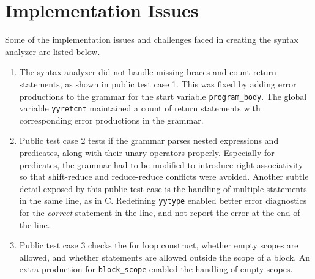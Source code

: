 \documentclass[journal,12pt,twocolumn]{IEEEtran}
\begin{document}
\section{Implementation Issues}
Some of the implementation issues and challenges faced in creating the syntax
analyzer are listed below.
\begin{enumerate}
    \item The syntax analyzer did not handle missing braces and count return
    statements, as shown in public test case 1. This was fixed by adding error
    productions to the grammar for the start variable \texttt{program\_body}.
    The global variable \texttt{yyretcnt} maintained a count of return
    statements with corresponding error productions in the grammar. 
    \item Public test case 2 tests if the grammar parses nested expressions and
    predicates, along with their unary operators properly. Especially for
    predicates, the grammar had to be modified to introduce right associativity
    so that shift-reduce and reduce-reduce conflicts were avoided. Another
    subtle detail exposed by this public test case is the handling of multiple
    statements in the same line, as in C. Redefining \texttt{yytype} enabled
    better error diagnostics for the \emph{correct} statement in the line, and
    not report the error at the end of the line.
    \item Public test case 3 checks the for loop construct, whether empty scopes
    are allowed, and whether statements are allowed outside the scope of a
    block. An extra production for \texttt{block\_scope} enabled the handling of
    empty scopes.
\end{enumerate}
\end{document}
